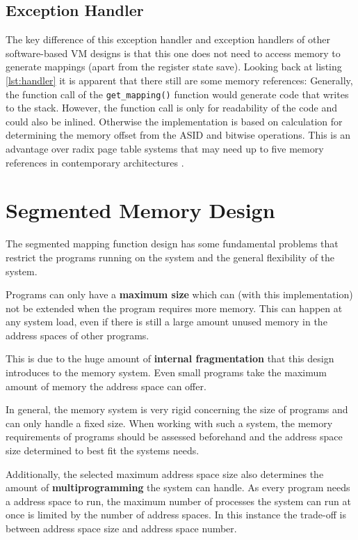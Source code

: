 \subsection{Exception Handler} The key difference of this exception handler and exception handlers
of other software-based VM designs is that this one does not need to access
memory to generate mappings (apart from the register state save).
Looking back at listing \ref{lst:handler} it is apparent that there still are some
memory references:
Generally, the function call of the \texttt{get\_mapping()} function would generate code that
writes to the stack. However, the function call is only for readability of the code and could also
be inlined.
Otherwise the implementation is based on calculation for determining the memory offset from
the ASID and bitwise operations.
This is an advantage over radix page table systems that may need up to five memory references
in contemporary architectures \cite{intel5LevelPaging5Level2017}.


\section{Segmented Memory Design}
The segmented mapping function design has some fundamental problems that restrict the programs running on the system and the general flexibility of the system.

Programs can only have a \textbf{maximum size} which can (with this implementation) not be extended when the program requires more memory. This can happen at any system load, even if there is still a large amount unused memory in the address spaces of other programs.

This is due to the huge amount of \textbf{internal fragmentation} that this design introduces to the memory system. Even small programs take the maximum amount of memory the address space can offer.

In general, the memory system is very rigid concerning the size of programs and can only handle a fixed size. When working with such a system, the memory requirements of programs should be assessed beforehand and the address space size determined to best fit the systems needs.

Additionally, the selected maximum address space size also determines the amount of \textbf{multiprogramming} the system can handle. As every program needs a address space to run, the maximum number of processes the system can run at once is limited by the number of address spaces.
In this instance the trade-off is between address space size and address space number.

